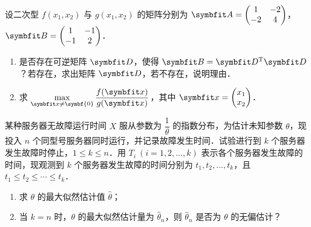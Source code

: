 \begin{question}[index=21,points=12]
设二次型 $f(x_1,x_2)$ 与 $g(x_1,x_2)$ 的矩阵分别为
$\symbfit A=\begin{pmatrix}1&-2\\-2&4\end{pmatrix}$，
$\symbfit B=\begin{pmatrix}1&-1\\-1&2\end{pmatrix}$．
\begin{enumerate}[label=（\arabic*）,leftmargin=2.5em,labelsep=.4em,itemsep=3pt,topsep=3pt]
\item 是否存在可逆矩阵 $\symbfit D$，使得 $\symbfit B=\symbfit D^{\mathrm T}\symbfit D$？若存在，求出矩阵 $\symbfit D$，若不存在，说明理由．
\item 求 $\displaystyle\max_{\symbfit x\ne\symbf{0}}\frac{f(\symbfit x)}{g(\symbfit x)}$，其中 $\symbfit x=\begin{pmatrix}x_1\\x_2\end{pmatrix}$．
\end{enumerate}
\end{question}
\QuestionBreak\WorkSpace

\begin{question}[index=22,points=12]
某种服务器无故障运行时间 $X$ 服从参数为 $\dfrac1\theta$ 的指数分布，为估计未知参数 $\theta$，现投入 $n$ 个同型号服务器同时运行，并记录故障发生时间．试验进行到 $k$ 个服务器发生故障时停止，$1\leq k\leq n$．用 $T_i\ (i=1,2,\ldots,k)$ 表示各个服务器发生故障的时间，现观测到 $k$ 个服务器发生故障的时间分别为 $t_1,t_2,\ldots,t_k$，且 $t_1\leq t_2\leq\cdots\leq t_k$．
\begin{enumerate}[label=（\arabic*）,leftmargin=2.5em,labelsep=.4em,itemsep=3pt,topsep=3pt]
\item 求 $\theta$ 的最大似然估计值 $\hat\theta$；
\item 当 $k=n$ 时，$\theta$ 的最大似然估计量为 $\hat\theta_n$，则 $\hat\theta_n$ 是否为 $\theta$ 的无偏估计？
\end{enumerate}
\end{question}
\WorkSpace
